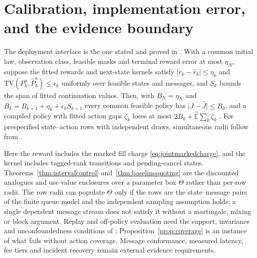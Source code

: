 \section{Calibration, implementation error, and the evidence boundary}\label{sec:deploymentcalibration}
The deployment interface is the one stated and proved in
\citet[Section~39]{NoguerAlonso2026Execution}. With a common initial law, observation class, feasible masks and terminal
reward error at most $\eta_N$, suppose the fitted rewards and next-state
kernels satisfy $\lvert r_k-\widehat r_k\rvert\le\eta_k$ and
$\mathrm{TV}(P_k^a,\widehat P_k^a)\le\epsilon_k$ uniformly over feasible states
and messages, and $S_k$ bounds the span of fitted continuation values. Then, with
$B_N=\eta_N$ and $B_k=B_{k+1}+\eta_k+\epsilon_kS_{k+1}$ every common feasible
policy has $\lvert J-\widehat J\rvert\le B_0$, and a compiled policy with fitted
action gaps $\zeta_k$ loses at most $2B_0+\widehat{\mathbb E}\sum_k\zeta_k$
\citep[Theorem~39.1]{NoguerAlonso2026Execution}. For prespecified state--action rows with
independent draws, simultaneous radii follow from
\citet[Proposition~39.2]{NoguerAlonso2026Execution}.

Here the reward includes the marked fill charge \eqref{eq:jointmarkedcharge}, and the kernel includes
tagged-rank transitions and pending-cancel states. Theorems~\ref{thm:intervalcontrol} and~\ref{thm:baselinequoting} are the
discounted analogues and use value enclosures over a parameter box $\Theta$
rather than per-row radii. The row radii can populate $\Theta$ only if the rows
are the state--message pairs of the finite queue model and the independent
sampling assumption holds; a single dependent message stream does not satisfy
it without a martingale, mixing or block argument. Replay and off-policy
evaluation need the support, invariance and unconfoundedness conditions of
\citet[Section~39.4]{NoguerAlonso2026Execution}; Proposition~\ref{prop:coverage} is an instance of what
fails without action coverage. Message conformance, measured latency, fee tiers
and incident recovery remain external evidence requirements.
